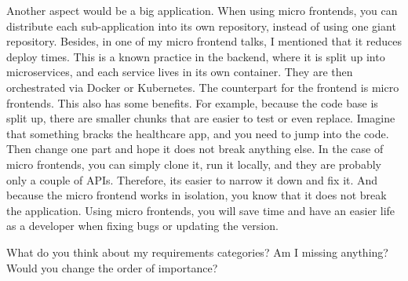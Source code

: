 \begin{description}
    \IvanJovanovic Another aspect would be a big application. When using micro frontends, you can distribute each sub-application into its own repository, instead of using one giant repository. Besides, in one of my micro frontend talks, I mentioned that it reduces deploy times. This is a known practice in the backend, where it is split up into microservices, and each service lives in its own container. They are then orchestrated via Docker or Kubernetes. The counterpart for the frontend is micro frontends.
    This also has some benefits. For example, because the code base is split up, there are smaller chunks that are easier to test or even replace. Imagine that something bracks the healthcare app, and you need to jump into the code. Then change one part and hope it does not break anything else.
    In the case of micro frontends, you can simply clone it, run it locally, and they are probably only a couple of APIs. Therefore, its easier to narrow it down and fix it. And because the micro frontend works in isolation, you know that it does not break the application. Using micro frontends, you will save time and have an easier life as a developer when fixing bugs or updating the version.

    \NicoVogel What do you think about my requirements categories? Am I missing anything? Would you change the order of importance?


\end{description}
